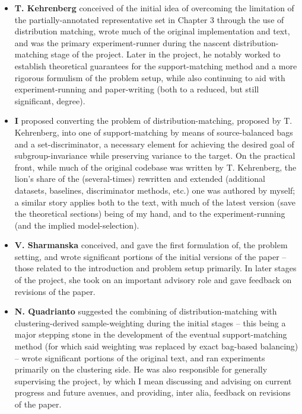 %
{\renewcommand\labelitemi{}
%
\begin{itemize}
  \item 
    \textbf{T. Kehrenberg} conceived of the initial idea of overcoming the limitation of the
    partially-annotated representative set in Chapter 3 through the use of distribution matching,
    wrote much of the original implementation and text, and was the primary experiment-runner
    during the nascent distribution-matching stage of the project.
    Later in the project, he notably worked to establish theoretical guarantees for the
    support-matching method and a more rigorous formulism of the problem setup, while also
    continuing to aid with experiment-running and paper-writing (both to a reduced, but still
    significant, degree).
  \item 
    \textbf{I} proposed converting the problem of distribution-matching, proposed by T. Kehrenberg,
    into one of support-matching by means of source-balanced bags and a set-discriminator, a
    necessary element for achieving the desired goal of subgroup-invariance while preserving
    variance to the target.
    On the practical front, while much of the original codebase was written by T. Kehrenberg, the
    lion's share of the (several-times) rewritten and extended (additional datasets, baselines,
    discriminator methods, etc.) one was authored by myself; a similar story applies both to the
    text, with much of the latest version (save the theoretical sections) being of my hand, and to
    the experiment-running (and the implied model-selection).
  \item
    \textbf{V. Sharmanska} conceived, and gave the first formulation of, the problem setting, and
    wrote significant portions of the initial versions of the paper -- those related to the
    introduction and problem setup primarily.
    In later stages of the project, she took on an important advisory role and gave feedback on
    revisions of the paper.
  \item 
    \textbf{N. Quadrianto} suggested the combining of distribution-matching with clustering-derived
    sample-weighting during the initial stages -- this being a major stepping stone in the
    development of the eventual support-matching method (for which said weighting was replaced by
    exact bag-based balancing) -- wrote significant portions of the original text, and ran
    experiments primarily on the clustering side.
    He was also responsible for generally supervising the project, by which I mean discussing and
    advising on current progress and future avenues, and providing, inter alia, feedback on
    revisions of the paper.
\end{itemize}
%
}
